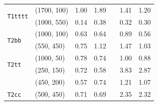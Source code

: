 \begin{table}[!t]
\begin{tabular}{ llccccc }
    \multirow{2}{*}{\texttt{T1tttt}}        & (1700, 100)   & 1.00 & 1.89 &  & 1.41 & 1.20 \\
                                            & (1000, 550)   & 0.14 & 0.38 &  & 0.32 & 0.30 \\ [0.5ex]
    \multirow{2}{*}{\texttt{T2bb}}          & (1000, 100)   & 0.63 & 0.64 &  & 0.89 & 0.56 \\
                                            & (550, 450)    & 0.75 & 1.12 &  & 1.47 & 1.03 \\ [0.5ex]
    \multirow{2}{*}{\texttt{T2tt}}          & (1000, 50)    & 0.78 & 0.74 &  & 1.00 & 0.88 \\
                                            & (250, 150)    & 0.72 & 0.58 &  & 3.83 & 2.87 \\
                                            & (450, 200)    & 0.57 & 0.74 &  & 1.21 & 1.07 \\ [0.5ex]
    \multirow{1}{*}{\texttt{T2cc}}          & (500, 450)    & 0.71 & 0.69 &  & 2.35 & 2.32 \\ [0.5ex]
    \hline
  \end{tabular}
\end{table}

